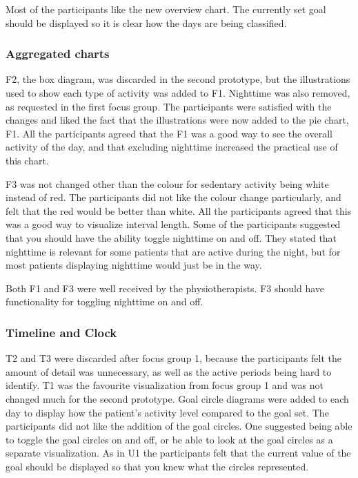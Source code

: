 Most of the participants like the new overview chart. The currently set goal should be displayed so it is clear how the days are being classified.

\subsubsection{Aggregated charts}
F2, the box diagram, was discarded in the second prototype, but the illustrations used to show each type of activity was added to F1. Nighttime was also removed, as requested in the first focus group. The participants were satisfied with the changes and liked the fact that the illustrations were now added to the pie chart, F1. All the participants agreed that the F1 was a good way to see the overall activity of the day, and that excluding nighttime increased the practical use of this chart.

F3 was not changed other than the colour for sedentary activity being white instead of red. The participants did not like the colour change particularly, and felt that the red would be better than white. All the participants agreed that this was a good way to visualize interval length. Some of the participants suggested that you should have the ability toggle nighttime on and off. They stated that nighttime is relevant for some patients that are active during the night, but for most patients displaying nighttime would just be in the way.

Both F1 and F3 were well received by the physiotherapists. F3 should have functionality for toggling nighttime on and off.

\subsubsection{Timeline and Clock}
T2 and T3 were discarded after focus group 1, because the participants felt the amount of detail was unnecessary, as well as the active periods being hard to identify. T1 was the favourite visualization from focus group 1 and was not changed much for the second prototype. Goal circle diagrams were added to each day to display how the patient's activity level compared to the goal set. The participants did not like the addition of the goal circles. One suggested being able to toggle the goal circles on and off, or be able to look at the goal circles as a separate visualization. As in U1 the participants felt that the current value of the goal should be displayed so that you knew what the circles represented.

